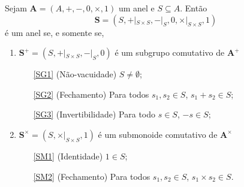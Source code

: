 \begin{proposition}
Sejam $\bm A=(A,+,-,0,\times,1)$ um anel e $S \subseteq A$. Então
	\begin{equation*}
	\bm S=(S,+|_{S \times S},-|_{S},0,\times|_{S \times S},1)
	\end{equation*}
é um anel se, e somente se,
	\begin{enumerate}
	\item $\bm S^+ = (S,+|_{S \times S},-|_{S},0)$ é um subgrupo comutativo de $\bm A^+$
			\begin{enumerate}
			\item [\ref{SG1}] (Não-vacuidade) $S \neq \emptyset$;
			\item [\ref{SG2}] (Fechamento) Para todos $s_1,s_2 \in S$, $s_1 + s_2 \in S$;
			\item [\ref{SG3}] (Invertibilidade) Para todo $s \in S$, $-s \in S$;
			\end{enumerate}
	\item $\bm S^\times = (S,\times|_{S \times S},1)$ é um submonoide comutativo de $\bm A^\times$
			\begin{enumerate}
			\item [\ref{SM1}] (Identidade) $1 \in S$;
			\item [\ref{SM2}] (Fechamento) Para todos $s_1,s_2 \in S$, $s_1 \times s_2 \in S$.
			\end{enumerate}
	\end{enumerate}
\end{proposition}
